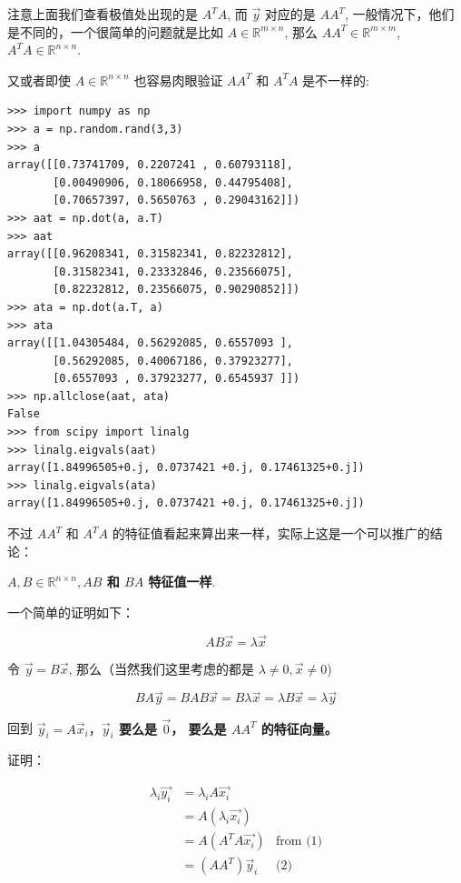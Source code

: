 \documentclass[
]{book}
\begin{document}
注意上面我们查看极值处出现的是 \(A^TA\), 而 \(\vec{y}\) 对应的是 \(AA^T\), 一般情况下，他们是不同的，一个很简单的问题就是比如 \(A \in \mathbb{R}^{m \times n}\), 那么 \(AA^T \in \mathbb{R}^{m \times m}\), \(A^TA \in \mathbb{R}^{n \times n}\).

又或者即使 \(A \in \mathbb{R}^{n \times n}\) 也容易肉眼验证 \(AA^T\) 和 \(A^TA\) 是不一样的:

\begin{verbatim}
>>> import numpy as np
>>> a = np.random.rand(3,3)
>>> a
array([[0.73741709, 0.2207241 , 0.60793118],
       [0.00490906, 0.18066958, 0.44795408],
       [0.70657397, 0.5650763 , 0.29043162]])
>>> aat = np.dot(a, a.T)
>>> aat
array([[0.96208341, 0.31582341, 0.82232812],
       [0.31582341, 0.23332846, 0.23566075],
       [0.82232812, 0.23566075, 0.90290852]])
>>> ata = np.dot(a.T, a)
>>> ata
array([[1.04305484, 0.56292085, 0.6557093 ],
       [0.56292085, 0.40067186, 0.37923277],
       [0.6557093 , 0.37923277, 0.6545937 ]])
>>> np.allclose(aat, ata)
False
>>> from scipy import linalg
>>> linalg.eigvals(aat)
array([1.84996505+0.j, 0.0737421 +0.j, 0.17461325+0.j])
>>> linalg.eigvals(ata)
array([1.84996505+0.j, 0.0737421 +0.j, 0.17461325+0.j])
\end{verbatim}

不过 \(AA^T\) 和 \(A^TA\) 的特征值看起来算出来一样，实际上这是一个可以推广的结论：

\textbf{\(A, B \in \mathbb{R}^{n \times n}, AB\) 和 \(BA\) 特征值一样}.

一个简单的证明如下：

\[AB\vec{x} = \lambda \vec{x}\]

令 \(\vec{y} = B\vec{x}\), 那么（当然我们这里考虑的都是 \(\lambda \ne 0, \vec{x} \ne 0\))

\[B A \vec{y} = BAB\vec{x} = B \lambda \vec{x} = \lambda B \vec{x} = \lambda \vec{y} \]

回到 \textbf{\(\vec{y}_i = A \vec{x}_i，\vec{y}_i\) 要么是 \(\vec{0}\)， 要么是 \(AA^T\) 的特征向量。}

证明：

\[
\begin{aligned}
\lambda_i \vec{y_i} {}
&= \lambda_i A\vec{x_i}\\
&= A (\lambda_i \vec{x_i}) \\
&= A (A^TA \vec{x_i}) & \text{from (1)}\\ 
&= (AA^T) \vec{y}_i & \text{(2)} \\ 
\end{aligned} 
\]
\end{document}
